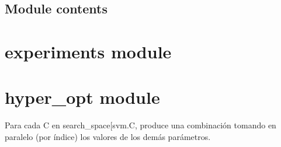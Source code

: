 \documentclass[letterpaper,10pt,english]{sphinxmanual}
\begin{document}
\section{Module contents}
\label{\detokenize{Model:module-Model}}\label{\detokenize{Model:module-contents}}
\sphinxstepscope


\chapter{experiments module}
\label{\detokenize{experiments:module-experiments}}\label{\detokenize{experiments:experiments-module}}\label{\detokenize{experiments::doc}}

\begin{fulllineitems}
\label{\detokenize{experiments:experiments.main}}
\pysigstartsignatures
\pysiglinewithargsret
{}
{\sphinxparamcomma {}}
{}
\pysigstopsignatures
\end{fulllineitems}


\sphinxstepscope


\chapter{hyper\_opt module}
\label{\detokenize{hyper_opt:module-hyper_opt}}\label{\detokenize{hyper_opt:hyper-opt-module}}\label{\detokenize{hyper_opt::doc}}

\begin{fulllineitems}
\label{\detokenize{hyper_opt:hyper_opt.generate_combinations}}
\pysigstartsignatures
\pysiglinewithargsret
{}
{}
{}
\pysigstopsignatures
\sphinxAtStartPar
Para cada C en search\_space{[}\textquotesingle{}svm.C\textquotesingle{}{]}, produce una combinación
tomando en paralelo (por índice) los valores de los demás parámetros.

\end{fulllineitems}
\end{document}
